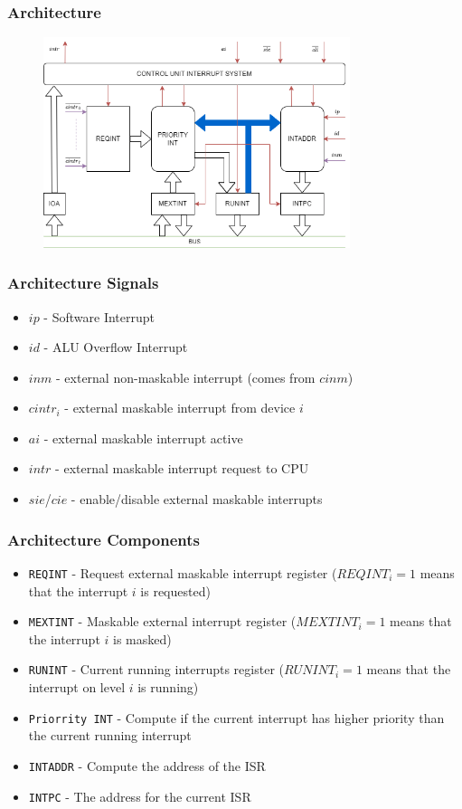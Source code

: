 \begin{frame}
    \frametitle{Architecture}
    \begin{figure}
        \centering
        \includegraphics[width=0.8\textwidth]{media/isarchitecture.png}
    \end{figure}
\end{frame}

\begin{frame}
    \frametitle{Architecture Signals}
    \begin{itemize}
        \item $ip$ - Software Interrupt
        \item $id$ - ALU Overflow Interrupt
        \item $inm$ - external non-maskable interrupt (comes from $cinm$)
        \item $cintr_{i}$ - external maskable interrupt from device $i$
        \item $ai$ - external maskable interrupt active
        \item $intr$ - external maskable interrupt request to CPU
        \item $sie$/$cie$ - enable/disable external maskable interrupts
    \end{itemize}
\end{frame}

\begin{frame}
    \frametitle{Architecture Components}
    \begin{itemize}
        \item \texttt{REQINT} - Request external maskable interrupt register ($REQINT_{i} = 1$ means that the interrupt $i$ is requested)
        \item \texttt{MEXTINT} - Maskable external interrupt register ($MEXTINT_{i} = 1$ means that the interrupt $i$ is masked)
        \item \texttt{RUNINT} - Current running interrupts register ($RUNINT_{i} = 1$ means that the interrupt on level $i$ is running)
        \item \texttt{Priorrity INT} - Compute if the current interrupt has higher priority than the current running interrupt
        \item \texttt{INTADDR} - Compute the address of the ISR
        \item \texttt{INTPC} - The address for the current ISR
    \end{itemize}
\end{frame}

